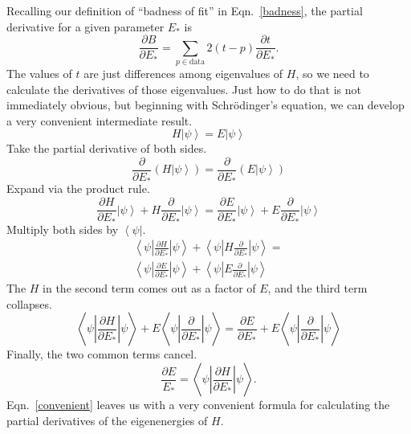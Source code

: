 \documentclass[twocolumn]{revtex4}
\newcommand{\bra}[1]{\left< #1 \right|}
\newcommand{\ket}[1]{\left| #1 \right>}
\newcommand{\innerp}[3]{\textstyle\left< #1 \left| #2 \right| #3 \right>}
\begin{document}
Recalling our definition of ``badness of fit'' in Eqn.~\ref{badness},
the partial derivative for a given parameter $E_*$ is
\begin{equation}
  \label{partials}
  \frac{\partial B}{\partial E_{*}} =
  \sum_{p \in \text{data}}2(t-p)\frac{\partial t}{\partial E_*}.
\end{equation}
The values of $t$ are just differences among eigenvalues of $H$, so we
need to calculate the derivatives of those eigenvalues. Just how to do
that is not immediately obvious, but beginning with Schr\"odinger's
equation, we can develop a very convenient intermediate result.
\begin{equation}
  H\ket{\psi} = E\ket{\psi}
\end{equation}
Take the partial derivative of both sides.
\begin{equation}
  \frac{\partial}{\partial E_*} (H\ket{\psi}) =
  \frac{\partial}{\partial E_*} (E\ket{\psi})
\end{equation}
Expand via the product rule.
\begin{equation}
  \frac{\partial H}{\partial E_*}\ket{\psi} +
  H\frac{\partial}{\partial E_*}\ket{\psi} =
  \frac{\partial E}{\partial E_*}\ket{\psi} +
  E\frac{\partial}{\partial E_*}\ket{\psi}
\end{equation}
Multiply both sides by $\bra{\psi}$.
\begin{multline}
  \innerp{\psi}{\frac{\partial H}{\partial E_*}}{\psi} +
  \innerp{\psi}{H\frac{\partial}{\partial E_*}}{\psi} =\\
  \innerp{\psi}{\frac{\partial E}{\partial E_*}}{\psi}+
  \innerp{\psi}{E\frac{\partial}{\partial E_*}}{\psi}
\end{multline}
The $H$ in the second term comes out as a factor of $E$, and the third
term collapses.
\begin{equation}
  \innerp{\psi}{\frac{\partial H}{\partial E_*}}{\psi} +
  E\innerp{\psi}{\frac{\partial}{\partial E_*}}{\psi} =
  \frac{\partial E}{\partial E_*} +
  E\innerp{\psi}{\frac{\partial}{\partial E_*}}{\psi}
\end{equation}
Finally, the two common terms cancel.
\begin{equation}
  \frac{\partial E}{E_*} =
  \innerp{\psi}{\frac{\partial H}{\partial E_*}}{\psi}.
  \label{convenient}
\end{equation}
Eqn.~\ref{convenient} leaves us with a very convenient formula for
calculating the partial derivatives of the eigenenergies of $H$.
\end{document}
